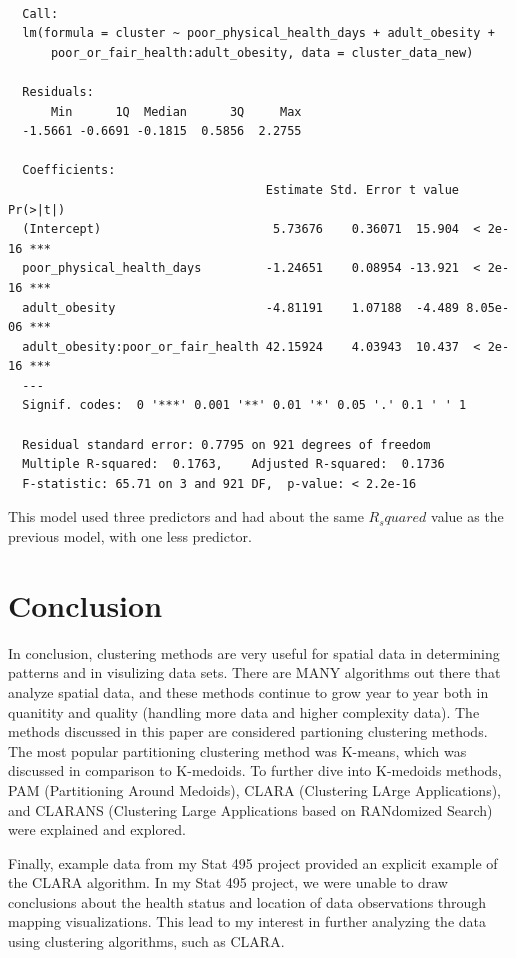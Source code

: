 \documentclass[12pt,twoside]{amherstthesis}
\begin{document}
  \begin{verbatim}
  
  Call:
  lm(formula = cluster ~ poor_physical_health_days + adult_obesity + 
      poor_or_fair_health:adult_obesity, data = cluster_data_new)
  
  Residuals:
      Min      1Q  Median      3Q     Max 
  -1.5661 -0.6691 -0.1815  0.5856  2.2755 
  
  Coefficients:
                                    Estimate Std. Error t value Pr(>|t|)    
  (Intercept)                        5.73676    0.36071  15.904  < 2e-16 ***
  poor_physical_health_days         -1.24651    0.08954 -13.921  < 2e-16 ***
  adult_obesity                     -4.81191    1.07188  -4.489 8.05e-06 ***
  adult_obesity:poor_or_fair_health 42.15924    4.03943  10.437  < 2e-16 ***
  ---
  Signif. codes:  0 '***' 0.001 '**' 0.01 '*' 0.05 '.' 0.1 ' ' 1
  
  Residual standard error: 0.7795 on 921 degrees of freedom
  Multiple R-squared:  0.1763,    Adjusted R-squared:  0.1736 
  F-statistic: 65.71 on 3 and 921 DF,  p-value: < 2.2e-16
  \end{verbatim}
  
  This model used three predictors and had about the same \(R_squared\)
  value as the previous model, with one less predictor.
  
  \chapter*{Conclusion}\label{conclusion}
  
  \setcounter{chapter}{4} \setcounter{section}{0}
  
  In conclusion, clustering methods are very useful for spatial data in
  determining patterns and in visulizing data sets. There are MANY
  algorithms out there that analyze spatial data, and these methods
  continue to grow year to year both in quanitity and quality (handling
  more data and higher complexity data). The methods discussed in this
  paper are considered partioning clustering methods. The most popular
  partitioning clustering method was K-means, which was discussed in
  comparison to K-medoids. To further dive into K-medoids methods, PAM
  (Partitioning Around Medoids), CLARA (Clustering LArge Applications),
  and CLARANS (Clustering Large Applications based on RANdomized Search)
  were explained and explored.
  
  Finally, example data from my Stat 495 project provided an explicit
  example of the CLARA algorithm. In my Stat 495 project, we were unable
  to draw conclusions about the health status and location of data
  observations through mapping visualizations. This lead to my interest in
  further analyzing the data using clustering algorithms, such as CLARA.
  
\end{document}

